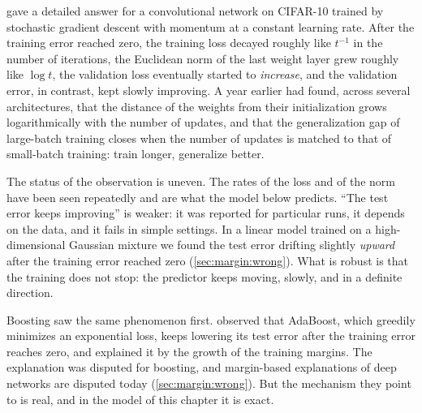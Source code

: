\begin{refsection}
\Textcite{SoudryEtAl2018} gave a detailed answer for a convolutional network on CIFAR-10 trained by stochastic gradient descent with momentum at a constant learning rate. After the training error reached zero, the training loss decayed roughly like $t^{-1}$ in the number of iterations, the Euclidean norm of the last weight layer grew roughly like $\log t$, the validation loss eventually started to \emph{increase}, and the validation error, in contrast, kept slowly improving. A year earlier \textcite{HofferHubaraSoudry2017} had found, across several architectures, that the distance of the weights from their initialization grows logarithmically with the number of updates, and that the generalization gap of large-batch training closes when the number of updates is matched to that of small-batch training: train longer, generalize better.


The status of the observation is uneven. The rates of the loss and of the norm have been seen repeatedly and are what the model below predicts. ``The test error keeps improving'' is weaker: it was reported for particular runs, it depends on the data, and it fails in simple settings. In a linear model trained on a high-dimensional Gaussian mixture we found the test error drifting slightly \emph{upward} after the training error reached zero (\cref{sec:margin:wrong}). What is robust is that the training does not stop: the predictor keeps moving, slowly, and in a definite direction.

Boosting saw the same phenomenon first. \Textcite{SchapireEtAl1998} observed that AdaBoost, which greedily minimizes an exponential loss, keeps lowering its test error after the training error reaches zero, and explained it by the growth of the training margins. The explanation was disputed for boosting, and margin-based explanations of deep networks are disputed today (\cref{sec:margin:wrong}). But the mechanism they point to is real, and in the model of this chapter it is exact.


\end{refsection}
